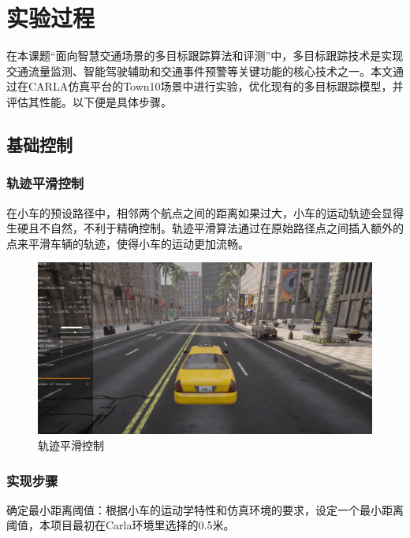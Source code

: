 \chapter{实验过程}

在本课题“面向智慧交通场景的多目标跟踪算法和评测”中，多目标跟踪技术是实现交通流量监测、智能驾驶辅助和交通事件预警等关键功能的核心技术之一。本文通过在CARLA仿真平台的Town10场景中进行实验，优化现有的多目标跟踪模型，并评估其性能。以下便是具体步骤。

\section{基础控制}
\subsection{轨迹平滑控制}

在小车的预设路径中，相邻两个航点之间的距离如果过大，小车的运动轨迹会显得生硬且不自然，不利于精确控制。轨迹平滑算法通过在原始路径点之间插入额外的点来平滑车辆的轨迹，使得小车的运动更加流畅。


\begin{figure}[htbp] %
	\centering
	\includegraphics[width=1\textwidth]{p9} %
	\caption{轨迹平滑控制} %
	\label{fig:p9} %
\end{figure}






\subsection{实现步骤}

确定最小距离阈值：根据小车的运动学特性和仿真环境的要求，设定一个最小距离阈值，本项目最初在Carla环境里选择的0.5米。

